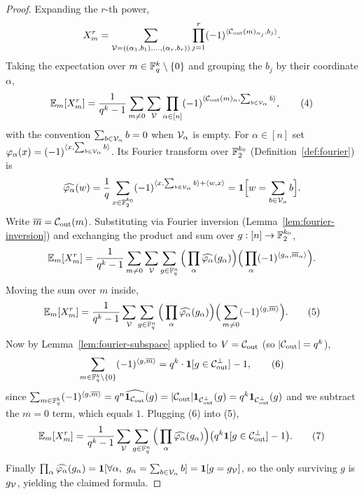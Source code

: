 \begin{proof}
  Expanding the $r$-th power,
  \[
    X_m^r = \sum_{\mathcal{V} = ((\alpha_1,b_1),\dots,(\alpha_r,b_r))}
      \prod_{j=1}^r (-1)^{\langle \mathcal{C}_{\mathrm{out}}(m)_{\alpha_j}, b_j\rangle} .
  \]
  Taking the expectation over $m \in \mathbb{F}_q^k \setminus \{0\}$ and grouping the
  $b_j$ by their coordinate $\alpha$,
  \begin{equation}
    \mathbb{E}_{m}[X_m^r] = \frac{1}{q^k-1}\sum_{m \neq 0}\sum_{\mathcal{V}}
      \prod_{\alpha \in [n]}(-1)^{\langle \mathcal{C}_{\mathrm{out}}(m)_\alpha, \sum_{b\in\mathcal{V}_\alpha}b\rangle},
    \tag{4}
  \end{equation}
  with the convention $\sum_{b \in \mathcal{V}_\alpha} b = 0$ when $\mathcal{V}_\alpha$ is
  empty. For $\alpha \in [n]$ set $\varphi_\alpha(x) =
  (-1)^{\langle x, \sum_{b\in\mathcal{V}_\alpha}b\rangle}$. Its Fourier transform over
  $\mathbb{F}_2^{k_0}$ (Definition~\ref{def:fourier}) is
  \[
    \widehat{\varphi_\alpha}(w) = \frac{1}{q}\sum_{x \in \mathbb{F}_2^{k_0}}
      (-1)^{\langle x, \sum_{b\in\mathcal{V}_\alpha}b\rangle + \langle w, x\rangle}
      = \mathbf{1}\Big[w = \sum_{b\in\mathcal{V}_\alpha}b\Big].
  \]
  Write $\overline{m} = \mathcal{C}_{\mathrm{out}}(m)$. Substituting via Fourier inversion
  (Lemma~\ref{lem:fourier-inversion}) and exchanging the product and sum over
  $g : [n] \to \mathbb{F}_2^{k_0}$,
  \[
    \mathbb{E}_m[X_m^r] = \frac{1}{q^k-1}\sum_{m\neq 0}\sum_{\mathcal{V}}\sum_{g \in \mathbb{F}_q^n}
      \Big(\prod_\alpha \widehat{\varphi_\alpha}(g_\alpha)\Big)
      \Big(\prod_\alpha (-1)^{\langle g_\alpha, \overline{m}_\alpha\rangle}\Big).
  \]
  Moving the sum over $m$ inside,
  \begin{equation}
    \mathbb{E}_m[X_m^r] = \frac{1}{q^k-1}\sum_{\mathcal{V}}\sum_{g\in\mathbb{F}_q^n}
      \Big(\prod_\alpha \widehat{\varphi_\alpha}(g_\alpha)\Big)
      \Big(\sum_{m\neq 0}(-1)^{\langle g, \overline{m}\rangle}\Big).
    \tag{5}
  \end{equation}
  Now by Lemma~\ref{lem:fourier-subspace} applied to $V = \mathcal{C}_{\mathrm{out}}$
  (so $|\mathcal{C}_{\mathrm{out}}| = q^k$),
  \begin{equation}
    \sum_{m \in \mathbb{F}_q^k \setminus\{0\}}(-1)^{\langle g, \overline{m}\rangle}
      = q^k\cdot \mathbf{1}[g \in \mathcal{C}_{\mathrm{out}}^\perp] - 1,
    \tag{6}
  \end{equation}
  since $\sum_{m \in \mathbb{F}_q^k}(-1)^{\langle g, \overline{m}\rangle} = q^n
  \widehat{\mathbf{1}_{\mathcal{C}_{\mathrm{out}}}}(g) = |\mathcal{C}_{\mathrm{out}}|\mathbf{1}_{\mathcal{C}_{\mathrm{out}}^\perp}(g) =
  q^k \mathbf{1}_{\mathcal{C}_{\mathrm{out}}^\perp}(g)$ and we subtract the $m=0$ term, which equals
  $1$. Plugging (6) into (5),
  \begin{equation}
    \mathbb{E}_m[X_m^r] = \frac{1}{q^k-1}\sum_{\mathcal{V}}\sum_{g\in\mathbb{F}_q^n}
      \Big(\prod_\alpha \widehat{\varphi_\alpha}(g_\alpha)\Big)
      \big(q^k\mathbf{1}[g\in\mathcal{C}_{\mathrm{out}}^\perp]-1\big).
    \tag{7}
  \end{equation}
  Finally $\prod_\alpha \widehat{\varphi_\alpha}(g_\alpha) =
  \mathbf{1}[\forall \alpha,\ g_\alpha = \sum_{b\in\mathcal{V}_\alpha}b] =
  \mathbf{1}[g = g_{\mathcal{V}}]$, so the only surviving $g$ is $g_{\mathcal{V}}$, yielding the
  claimed formula.
\end{proof}

